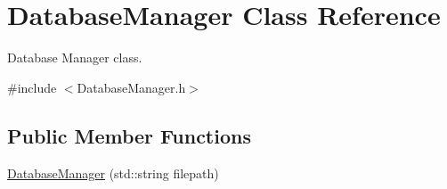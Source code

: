 \hypertarget{class_database_manager}{\section{Database\-Manager Class Reference}
\label{class_database_manager}
}


Database Manager class.  




{\ttfamily \#include $<$Database\-Manager.\-h$>$}

\subsection*{Public Member Functions}
\begin{DoxyCompactItemize}
\item 
\hypertarget{class_database_manager_a24e3c3701ce01fdac96cc170b334aeba}{\hyperlink{class_database_manager_a24e3c3701ce01fdac96cc170b334aeba}{Database\-Manager} (std\-::string filepath)}\label{class_database_manager_a24e3c3701ce01fdac96cc170b334aeba}


\end{DoxyCompactItemize}
